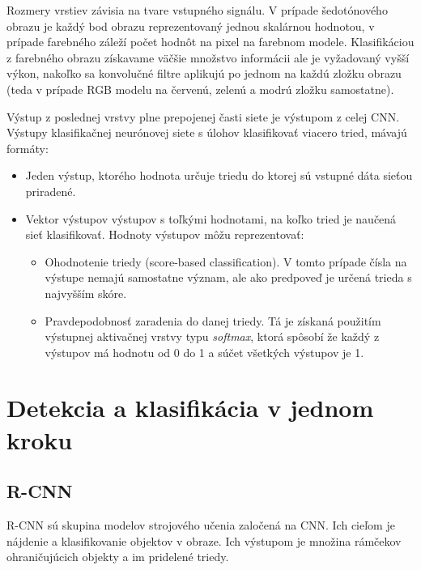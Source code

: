        Rozmery vrstiev závisia na tvare vstupného signálu. V prípade šedotónového obrazu je každý bod obrazu reprezentovaný jednou skalárnou hodnotou, v prípade farebného záleží počet hodnôt na pixel na farebnom modele. Klasifikáciou z farebného obrazu získavame väčšie množstvo informácii ale je vyžadovaný vyšší výkon, nakoľko sa konvolučné filtre aplikujú po jednom na každú zložku obrazu (teda v prípade RGB modelu na červenú, zelenú a modrú zložku samostatne).

        Výstup z poslednej vrstvy plne prepojenej časti siete je výstupom z celej \ac{CNN}. Výstupy klasifikačnej neurónovej siete s úlohov klasifikovať viacero tried, mávajú formáty:

        \begin{itemize}
            \item Jeden výstup, ktorého hodnota určuje triedu do ktorej sú vstupné dáta sieťou priradené.
            \item Vektor výstupov výstupov s toľkými hodnotami, na koľko tried je naučená sieť klasifikovať. Hodnoty výstupov môžu reprezentovať:
            \begin{itemize}
                \item Ohodnotenie triedy (score-based classification). V tomto prípade čísla na výstupe nemajú samostatne význam, ale ako predpoveď je určená trieda s najvyšším skóre.
                \item Pravdepodobnosť zaradenia do danej triedy. Tá je získaná použitím výstupnej aktivačnej vrstvy typu \emph{softmax}, ktorá spôsobí že každý z výstupov má hodnotu od 0 do 1 a súčet všetkých výstupov je 1.
            \end{itemize}
        \end{itemize}
        

\chapter{Detekcia a klasifikácia v jednom kroku}

    \section{R-CNN}

        \ac{R-CNN} sú skupina modelov strojového učenia zaločená na \ac{CNN}. Ich cieľom je nájdenie a klasifikovanie objektov v obraze. Ich výstupom je množina rámčekov ohraničujúcich objekty a im pridelené triedy.

